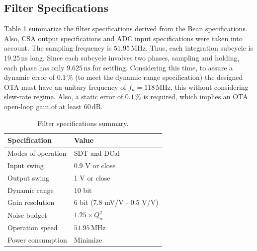 \subsection{Filter Specifications}

Table \ref{tab:filter_specs} summarize the filter specifications derived from the Bean specifications. Also, CSA output specifications and ADC input specifications were taken into account. The sampling frequency is $51.95\,\text{MHz}$. Thus, each integration subcycle is $19.25\,\text{ns}$ long. Since each subcycle involves two phases, sampling and holding, each phase has only $9.625\,\text{ns}$ for settling. Considering this time, to assure a dynamic error of $0.1\,\%$ (to meet the dynamic range specification) the designed OTA must have an unitary frequency of $f_u = 118\,\text{MHz}$, this without considering slew-rate regime. Also, a static error of $0.1\,\%$ is required, which implies an OTA open-loop gain of at least $60\,\text{dB}$. 

\begin{table}[!t]
	\begin{center}
		\begin{tabular}{|l|l|}\hline
			{\bf Specification} & {\bf Value} \\ \hline\hline
			Modes of operation & SDT and DCal \\ \hline
			Input swing & 0.9 V or close \\ \hline
			Output swing & 1 V or close \\ \hline
			Dynamic range & 10 bit \\ \hline
			Gain resolution & 6 bit (7.8 mV/V - 0.5 V/V) \\ \hline
			Noise budget & $1.25\times Q_n^2$ \\ \hline
			Operation speed & $51.95\,\text{MHz}$ \\ \hline
			Power consumption & Minimize\\\hline
		\end{tabular}
		\vspace*{5pt}
		\caption{Filter specifications summary.}\label{tab:filter_specs}
	\end{center}
\end{table}

